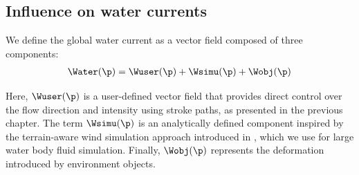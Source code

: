 



\subsection{Influence on water currents}
\label{sec:env-obj-water-currents}

We define the global water current as a vector field composed of three components:
\begin{align}
    \Water(\p) = \Wuser(\p) + \Wsimu(\p) + \Wobj(\p)
\end{align}

Here, $\Wuser(\p)$ is a user-defined vector field that provides direct control over the flow direction and intensity using stroke paths, as presented in the previous chapter. The term $\Wsimu(\p)$ is an analytically defined component inspired by the terrain-aware wind simulation approach introduced in \citep{Paris2019b}, which we use for large water body fluid simulation. Finally, $\Wobj(\p)$ represents the deformation introduced by environment objects.

